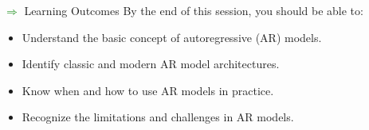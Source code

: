 \begin{frame}[allowframebreaks]{\textcolor{green}{$\Rightarrow$} Learning Outcomes}
    By the end of this session, you should be able to:
    \begin{itemize}
        \item Understand the basic concept of autoregressive (AR) models.
        \item Identify classic and modern AR model architectures.
        \item Know when and how to use AR models in practice.
        \item Recognize the limitations and challenges in AR models.
    \end{itemize}
\end{frame}